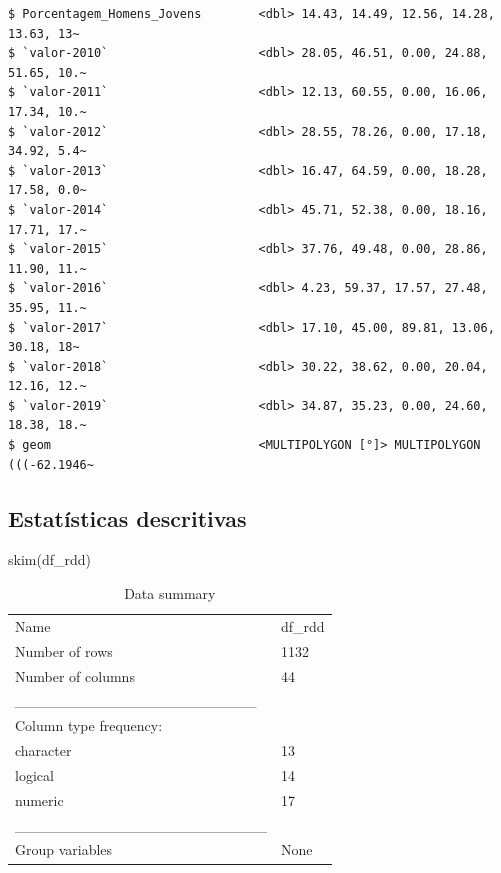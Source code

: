 \documentclass[
  letterpaper,
  DIV=11,
  numbers=noendperiod]{scrartcl}
\newenvironment{Shaded}{\begin{snugshade}}{\end{snugshade}}
\newcommand{\FunctionTok}[1]{\textcolor[rgb]{0.28,0.35,0.67}{#1}}
\newcommand{\NormalTok}[1]{\textcolor[rgb]{0.00,0.23,0.31}{#1}}
\begin{document}
\begin{verbatim}
$ Porcentagem_Homens_Jovens        <dbl> 14.43, 14.49, 12.56, 14.28, 13.63, 13~
$ `valor-2010`                     <dbl> 28.05, 46.51, 0.00, 24.88, 51.65, 10.~
$ `valor-2011`                     <dbl> 12.13, 60.55, 0.00, 16.06, 17.34, 10.~
$ `valor-2012`                     <dbl> 28.55, 78.26, 0.00, 17.18, 34.92, 5.4~
$ `valor-2013`                     <dbl> 16.47, 64.59, 0.00, 18.28, 17.58, 0.0~
$ `valor-2014`                     <dbl> 45.71, 52.38, 0.00, 18.16, 17.71, 17.~
$ `valor-2015`                     <dbl> 37.76, 49.48, 0.00, 28.86, 11.90, 11.~
$ `valor-2016`                     <dbl> 4.23, 59.37, 17.57, 27.48, 35.95, 11.~
$ `valor-2017`                     <dbl> 17.10, 45.00, 89.81, 13.06, 30.18, 18~
$ `valor-2018`                     <dbl> 30.22, 38.62, 0.00, 20.04, 12.16, 12.~
$ `valor-2019`                     <dbl> 34.87, 35.23, 0.00, 24.60, 18.38, 18.~
$ geom                             <MULTIPOLYGON [°]> MULTIPOLYGON (((-62.1946~
\end{verbatim}

\hypertarget{estatuxedsticas-descritivas}{%
\subsection{Estatísticas
descritivas}\label{estatuxedsticas-descritivas}}

\begin{Shaded}
\begin{Highlighting}[]
\FunctionTok{skim}\NormalTok{(df\_rdd)}
\end{Highlighting}
\end{Shaded}

\begin{longtable}[]{@{}ll@{}}
\caption{Data summary}\tabularnewline
\toprule\noalign{}
\endfirsthead
\endhead
\bottomrule\noalign{}
\endlastfoot
Name & df\_rdd \\
Number of rows & 1132 \\
Number of columns & 44 \\
\_\_\_\_\_\_\_\_\_\_\_\_\_\_\_\_\_\_\_\_\_\_\_ & \\
Column type frequency: & \\
character & 13 \\
logical & 14 \\
numeric & 17 \\
\_\_\_\_\_\_\_\_\_\_\_\_\_\_\_\_\_\_\_\_\_\_\_\_ & \\
Group variables & None \\
\end{longtable}
\end{document}
